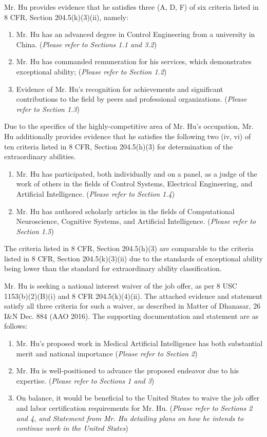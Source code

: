 \documentclass{article}
\begin{document}
Mr. Hu provides evidence that he satisfies three (A, D, F) of six criteria listed in 8 CFR, Section 204.5(k)(3)(ii), namely:
\begin{enumerate}
    \item Mr. Hu has an advanced degree in Control Engineering from a university in China. ({\it Please refer to Sections 1.1 and 3.2})
    \item Mr. Hu has commanded remuneration for his services, which demonstrates exceptional ability; ({\it Please refer to Section 1.2})
    \item Evidence of Mr. Hu's recognition for achievements and significant contributions to the field by peers and professional organizations. ({\it Please refer to Section 1.3})
\end{enumerate}
Due to the specifics of the highly-competitive area of Mr. Hu's occupation, Mr. Hu additionally provides evidence that he satisfies the following two (iv, vi) of ten criteria listed in 8 CFR, Section 204.5(h)(3) for determination of the extraordinary abilities. 
\begin{enumerate}
    \item Mr. Hu has participated, both individually and on a panel, as a judge of the work of others in the fields of Control Systems, Electrical Engineering, and Artificial Intelligence. ({\it Please refer to Section 1.4})
    \item Mr. Hu has authored scholarly articles in the fields of Computational Neuroscience, Cognitive Systems, and Artificial Intelligence. ({\it Please refer to Section 1.5})
\end{enumerate}

The criteria listed in 8 CFR, Section 204.5(h)(3) are comparable to the criteria listed in 8 CFR, Section 204.5(k)(3)(ii) due to the standards of exceptional ability being lower than the standard for extraordinary ability classification.

Mr. Hu is seeking a national interest waiver of the job offer, as per 8 USC 1153(b)(2)(B)(i) and 8 CFR  204.5(k)(4)(ii). The attached evidence and statement satisfy all three criteria for such a waiver, as described in Matter of Dhanasar, 26 I\&N Dec. 884 (AAO 2016). The supporting documentation and statement are as follows:

\begin{enumerate}
    \item Mr. Hu's proposed work in Medical Artificial Intelligence has both substantial merit and national importance ({\it Please refer to Section 2})
    \item Mr. Hu is well-positioned to advance the proposed endeavor due to his expertise. ({\it Please refer to Sections 1 and 3})
    \item On balance, it would be beneficial to the United States to waive the job offer and labor certification requirements for Mr. Hu. ({\it Please refer to Sections 2 and 4, and Statement from Mr. Hu detailing plans on how he intends to continue work in the United States})
\end{enumerate}
\end{document}
